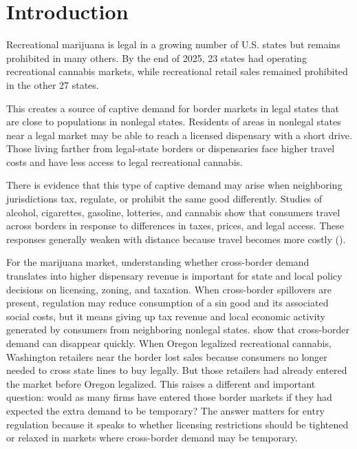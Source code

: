 \documentclass[12pt]{article}
\begin{document}
\section{Introduction}

Recreational marijuana is legal in a growing number of U.S. states but remains prohibited in many others. By the end of 2025, 23 states had operating recreational cannabis markets, while recreational retail sales remained prohibited in the other 27 states.

This creates a source of captive demand for border markets in legal states that are close to populations in nonlegal states. Residents of areas in nonlegal states near a legal market may be able to reach a licensed dispensary with a short drive. Those living farther from legal-state borders or dispensaries face higher travel costs and have less access to legal recreational cannabis.

There is evidence that this type of captive demand may arise when neighboring jurisdictions tax, regulate, or prohibit the same good differently. Studies of alcohol, cigarettes, gasoline, lotteries, and cannabis show that consumers travel across borders in response to differences in taxes, prices, and legal access. These responses generally weaken with distance because travel becomes more costly (\cite{AsplundFribergWilander2007, Lovenheim2008, BeattyLarsenSommervoll2009, ChandraHeadTappata2014}).

For the marijuana market, understanding whether cross-border demand translates into higher dispensary revenue is important for state and local policy decisions on licensing, zoning, and taxation. When cross-border spillovers are present, regulation may reduce consumption of a sin good and its associated social costs, but it means giving up tax revenue and local economic activity generated by consumers from neighboring nonlegal states. \cite{HansenMillerWeber2020} show that cross-border demand can disappear quickly. When Oregon legalized recreational cannabis, Washington retailers near the border lost sales because consumers no longer needed to cross state lines to buy legally. But those retailers had already entered the market before Oregon legalized. This raises a different and important question: would as many firms have entered those border markets if they had expected the extra demand to be temporary? The answer matters for entry regulation because it speaks to whether licensing restrictions should be tightened or relaxed in markets where cross-border demand may be temporary.
\end{document}
